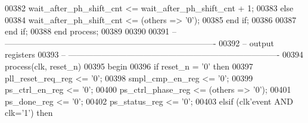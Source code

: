 \begin{DoxyCode}
00382          \textcolor{vhdlchar}{wait_after_ph_shift_cnt} \textcolor{vhdlchar}{<=}  \textcolor{vhdlchar}{wait_after_ph_shift_cnt} \textcolor{vhdlchar}{+} \textcolor{vhdllogic}{}\textcolor{vhdllogic}{1};
00383       \textcolor{keywordflow}{else}
00384          \textcolor{vhdlchar}{wait_after_ph_shift_cnt} \textcolor{vhdlchar}{<=} \textcolor{vhdlchar}{(}\textcolor{keywordflow}{others} \textcolor{vhdlchar}{=}\textcolor{vhdlchar}{>} \textcolor{vhdlchar}{'}\textcolor{vhdllogic}{}\textcolor{vhdllogic}{0}\textcolor{vhdlchar}{'}\textcolor{vhdlchar}{)};
00385       \textcolor{keywordflow}{end} \textcolor{keywordflow}{if};
00386       
00387    \textcolor{keywordflow}{end} \textcolor{keywordflow}{if};
00388 \textcolor{keywordflow}{end} \textcolor{keywordflow}{process};
00389 
00390 
00391 \textcolor{keyword}{-- ----------------------------------------------------------------------------}
00392 \textcolor{keyword}{-- output registers}
00393 \textcolor{keyword}{-- ----------------------------------------------------------------------------}
00394 \textcolor{keywordflow}{process}(clk, reset_n)
00395 \textcolor{vhdlkeyword}{begin}
00396    \textcolor{keywordflow}{if} \textcolor{vhdlchar}{reset_n} \textcolor{vhdlchar}{=} \textcolor{vhdlchar}{'}\textcolor{vhdllogic}{}\textcolor{vhdllogic}{0}\textcolor{vhdlchar}{'} \textcolor{keywordflow}{then} 
00397       \textcolor{vhdlchar}{pll_reset_req_reg} \textcolor{vhdlchar}{<=} \textcolor{vhdlchar}{'}\textcolor{vhdllogic}{}\textcolor{vhdllogic}{0}\textcolor{vhdlchar}{'};
00398       \textcolor{vhdlchar}{smpl_cmp_en_reg}   \textcolor{vhdlchar}{<=} \textcolor{vhdlchar}{'}\textcolor{vhdllogic}{}\textcolor{vhdllogic}{0}\textcolor{vhdlchar}{'};
00399       \textcolor{vhdlchar}{ps_ctrl_en_reg}    \textcolor{vhdlchar}{<=} \textcolor{vhdlchar}{'}\textcolor{vhdllogic}{}\textcolor{vhdllogic}{0}\textcolor{vhdlchar}{'};
00400       \textcolor{vhdlchar}{ps_ctrl_phase_reg} \textcolor{vhdlchar}{<=} \textcolor{vhdlchar}{(}\textcolor{keywordflow}{others} \textcolor{vhdlchar}{=}\textcolor{vhdlchar}{>} \textcolor{vhdlchar}{'}\textcolor{vhdllogic}{}\textcolor{vhdllogic}{0}\textcolor{vhdlchar}{'}\textcolor{vhdlchar}{)};
00401       \textcolor{vhdlchar}{ps_done_reg}       \textcolor{vhdlchar}{<=} \textcolor{vhdlchar}{'}\textcolor{vhdllogic}{}\textcolor{vhdllogic}{0}\textcolor{vhdlchar}{'};
00402       \textcolor{vhdlchar}{ps_status_reg}     \textcolor{vhdlchar}{<=} \textcolor{vhdlchar}{'}\textcolor{vhdllogic}{}\textcolor{vhdllogic}{0}\textcolor{vhdlchar}{'};
00403    \textcolor{keywordflow}{elsif} \textcolor{vhdlchar}{(}\textcolor{vhdlchar}{clk}\textcolor{vhdlchar}{'}\textcolor{vhdlkeyword}{event} \textcolor{keywordflow}{AND} \textcolor{vhdlchar}{clk}\textcolor{vhdlchar}{=}\textcolor{vhdlchar}{'}\textcolor{vhdllogic}{}\textcolor{vhdllogic}{1}\textcolor{vhdlchar}{'}\textcolor{vhdlchar}{)} \textcolor{keywordflow}{then}

\end{DoxyCode}
